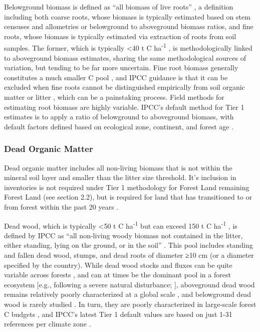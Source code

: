 \documentclass[, manuscript]{copernicus}
\begin{document}
Belowground biomass is defined as ``all biomass of live roots''
\citep{ipcc_good_2003, ipcc_2006_2006}, a definition including both
coarse roots, whose biomass is typically estimated based on stem
censuses and allometries or belowground to aboveground biomass ratios,
and fine roots, whose biomass is typically estimated via extraction of
roots from soil samples. The former, which is typically \textless40 t C
ha\textsuperscript{-1} \citep{anderson-teixeira_carbon_2021}, is
methodologically linked to aboveground biomass estimates, sharing the
same methodological sources of variation, but tending to be far more
uncertain. Fine root biomass generally constitutes a much smaller C pool
\citep[typically \textless5 t C
ha\textsuperscript{-1},][]{anderson-teixeira_carbon_2021}, and IPCC
guidance is that it can be excluded when fine roots cannot be
distinguished empirically from soil organic matter or litter
\citep{ipcc_2006_2006}, which can be a painstaking process. Field
methods for estimating root biomass are highly variable. IPCC's default
method for Tier 1 estimates is to apply a ratio of belowground to
aboveground biomass, with default factors defined based on ecological
zone, continent, and forest age \citep{ipcc_2006_2006, ipcc_2019_2019}.

\subsubsection{Dead Organic Matter}

Dead organic matter includes all non-living biomass that is not within
the mineral soil layer and smaller than the litter size threshold. It's
inclusion in inventories is not required under Tier 1 methodology for
Forest Land remaining Forest Land (see section 2.2), but is required for
land that has transitioned to or from forest within the past 20 years
\citep{ipcc_2006_2006}.

Dead wood, which is typically \textless50 t C ha\textsuperscript{-1} but
can exceed 150 t C ha\textsuperscript{-1}
\citep{anderson-teixeira_carbon_2021}, is defined by IPCC as ``all
non-living woody biomass not contained in the litter, either standing,
lying on the ground, or in the soil''
\citep{ipcc_good_2003, ipcc_2006_2006}. This pool includes standing and
fallen dead wood, stumps, and dead roots of diameter ≥10 cm (or a
diameter specified by the country). While dead wood stocks and fluxes
can be quite variable across forests
\citep{anderson-teixeira_carbon_2021}, and can at times be the dominant
pool in a forest ecosystem {[}e.g., following a severe natural
disturbance; \citet{carmona_coarse_2002}{]}, aboveground dead wood
remains relatively poorly characterized at a global scale
\citep{anderson-teixeira_carbon_2021}, and belowground dead wood is
rarely studied \citep{merganicova_dadwood_2012}. In turn, they are
poorly characterized in large-scale forest C budgets
\citep{pan_large_2011, harris_global_2021}, and IPCC's latest Tier 1
default values are based on just 1-31 references per climate zone
\citep[Table 2.2 in][]{ipcc_2019_2019}.
\end{document}
